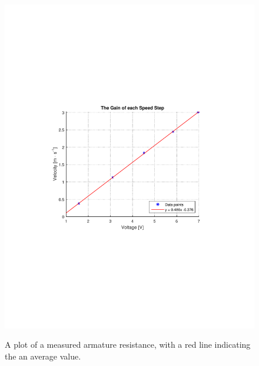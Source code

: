 \begin{figure}[H]
  \centering
  {
    \includegraphics[width=1.2\textwidth]{figures/GainOfEachSpeedStep.pdf}
  }
  \caption{A plot of a measured armature resistance, with a red line indicating the an average value.}
  \label{armatureResistance}
\end{figure}



